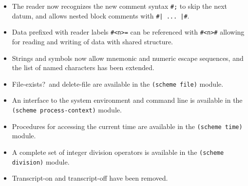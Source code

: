 \begin{itemize}
\item The reader now recognizes the new comment syntax {\tt \#;} to
skip the next datum, and allows nested block comments with
{\tt \#| ... |\#}.

\item Data prefixed with reader labels {\tt \#<n>=} can be referenced
with {\tt \#<n>\#} allowing for reading and writing of data with
shared structure.

\item Strings and symbols now allow mnemonic and numeric escape
sequences, and the list of named characters has been extended.

\item {\cf File-exists?}\ and {\cf delete-file} are available in the
{\tt (scheme file)} module.

\item An interface to the system environment and command line is
available in the {\tt (scheme process-context)} module.

\item Procedures for accessing the current time are available in the
{\tt (scheme time)} module.

\item A complete set of integer division operators is available in the
{\tt (scheme division)} module.

\item {\cf Transcript-on} and {\cf transcript-off} have been removed.

\end{itemize}


